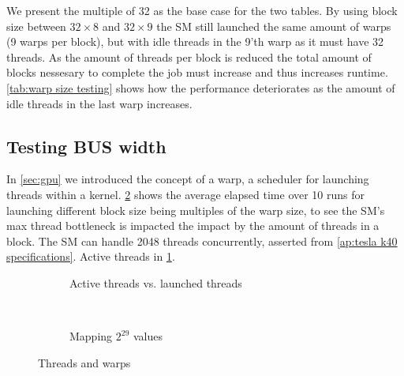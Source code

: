 We present the multiple of 32 as the base case for the two tables.
By using block size between $32 \times 8$ and $32 \times 9$ the SM still launched the same amount of warps (9 warps per block), but with idle threads in the 9'th warp as it must have 32 threads.
As the amount of threads per block is reduced the total amount of blocks nessesary to complete the job must increase and thus increases runtime.
\cref{tab:warp size testing} shows how the performance deteriorates as the amount of idle threads in the last warp increases.

\subsection{Testing BUS width}
\label{sec:testing BUS width}

In \cref{sec:gpu} we introduced the concept of a warp, a scheduler for launching threads within a kernel.
\cref{fig:block size testing} shows the average elapsed time over 10 runs for launching different block size being multiples of the warp size, to see the SM's max thread bottleneck is impacted the impact by the amount of threads in a block.
The SM can handle 2048 threads concurrently, asserted from \cref{ap:tesla k40 specifications}.
Active threads in \cref{fig:active threads}.

\begin{figure*}[t]
  \centering
  \begin{subfigure}[b]{.49\linewidth}
    \centering
    \resizebox{!}{.80\textwidth}{
      
    }
    \caption{Active threads vs. launched threads}
    \label{fig:active threads}
  \end{subfigure}%
  ~
  \begin{subfigure}[b]{.49\linewidth}
    \centering
    \resizebox{!}{.80\textwidth}{
      
    }
    \caption{Mapping $2^{29}$ values}
    \label{fig:block size testing}
  \end{subfigure}%
  \caption{Threads and warps}
  \label{fig:threads and warps}
\end{figure*}

